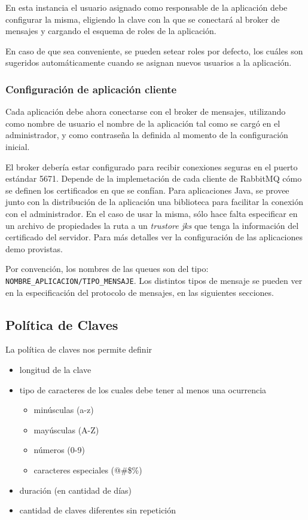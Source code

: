 En esta instancia el usuario asignado como responsable de la aplicación debe configurar la misma, eligiendo la
clave con la que se conectará al broker de mensajes y cargando el esquema de roles de la aplicación.

En caso de que sea conveniente, se pueden setear roles por defecto, los cuáles son sugeridos automáticamente
cuando se asignan nuevos usuarios a la aplicación.

\subsubsection{Configuración de aplicación cliente}
Cada aplicación debe ahora conectarse con el broker de mensajes, utilizando como nombre de usuario el nombre de
la aplicación tal como se cargó en el administrador, y como contraseña la definida al momento de la configuración
inicial.

El broker debería estar configurado para recibir conexiones seguras en el puerto estándar 5671. Depende de la
implemetación de cada cliente de RabbitMQ cómo se definen los certificados en que se confían. Para aplicaciones
Java, se provee junto con la distribución de la aplicación una biblioteca para facilitar la conexión con el
administrador. En el caso de usar la misma, sólo hace falta especificar en un archivo de propiedades la ruta
a un \textit{trustore jks} que tenga la información del certificado del servidor. Para más detalles ver la
configuración de las aplicaciones demo provistas.

Por convención, los nombres de las queues son del tipo: \texttt{NOMBRE\_APLICACION/TIPO\_MENSAJE}. Los distintos
tipos de mensaje se pueden ver en la especificación del protocolo de mensajes, en las siguientes secciones.

\subsection{Política de Claves}
La política de claves nos permite definir

\begin{itemize}
  \item longitud de la clave
  \item tipo de caracteres de los cuales debe tener al menos una ocurrencia
  \begin{itemize}
    \item minúsculas (a-z)  
    \item mayúsculas (A-Z)
    \item números (0-9)
    \item caracteres especiales (@\#\$\%)
  \end{itemize}
  \item duración (en cantidad de días)
  \item cantidad de claves diferentes sin repetición
\end{itemize}

